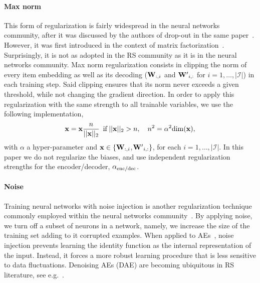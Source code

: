 \paragraph{Max norm} 
This form of regularization is fairly widespread in the neural networks community, 
after it was discussed by the authors of drop-out in the same paper~\cite{Srivastava:2014:dropout}.
However, it was first introduced in the context of matrix factorization~\cite{Srebro:2005:max_norm}. 
Surprisingly, it is not as adopted in the RS community as it is in the neural networks community.
Max norm regularization consists in clipping the norm of every item embedding as well as its decoding
(${\bf W}_{:,i}$ and ${\bf W'}_{i,:}$ for $i=1,\ldots , |\mathcal{I}|$) in each training step.
Said clipping ensures that its norm never exceeds a given threshold, while not changing the gradient direction.
In order to apply this regularization with the same strength to all trainable variables, we use the following implementation,
\begin{equation}\label{eq:max_norm_implementation}
{\bf x} = {\bf x}\frac{n}{||{\bf x}||_2}\,\,\, {\rm if}\, ||{\bf x}||_2>n,~~~n^2 = \alpha^2 {\rm dim}({\bf x}),
\end{equation}
with $\alpha$ a hyper-parameter and ${\bf x}\in \{ {\bf W}_{:,i}$,${\bf W'}_{i,:} \}$, for each $i=1,\ldots , |\mathcal{I}|$. In this paper we do not regularize the biases, and use independent regularization strengths for the encoder/decoder, $\alpha_{\rm enc/dec}$.

\paragraph{Noise}
Training neural networks with noise injection is another regularization technique commonly employed within the neural networks community~\cite{Goodfellow-et-al-2016}.
By applying noise, we turn off a subset of neurons in a network, namely, we increase the size of the training set adding to it corrupted examples.
When applied to AEs~\cite{Vincent:2008:ECRF-AE}, noise injection prevents learning the identity function as the internal representation of the input.
Instead, it forces a more robust learning procedure that is less sensitive to data fluctuations. Denoising AEs (DAE) are becoming ubiquitous in RS literature, see e.g.~\cite{Wu:2016:CDAE-topN, liang:2018:VAE, Li:2015:DCF_marginalizedAE}.


